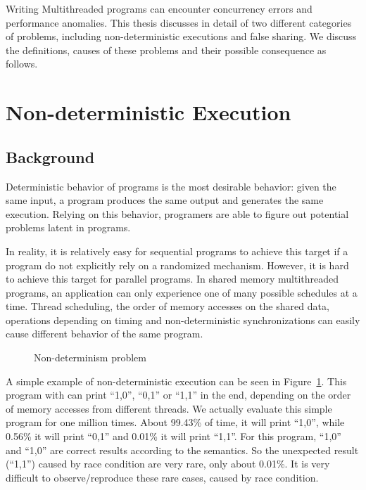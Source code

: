 \label{chapter:problems}

Writing Multithreaded programs can encounter concurrency errors and performance anomalies. This thesis discusses in detail of two different categories of problems, including non-deterministic executions and false sharing.  We discuss the definitions, causes of these problems and their possible consequence as follows.


\section{Non-deterministic Execution}

\subsection{Background}
Deterministic behavior of programs is the most desirable behavior: given the same input, a program
produces the same output and generates the same execution. Relying on this behavior, programers
are able to figure out potential problems latent in programs. 

In reality, it is relatively easy for sequential programs to achieve this target if a program do not explicitly rely on a randomized mechanism. 
However, it is hard to achieve this target for parallel programs. In shared memory multithreaded programs, an application can only experience one of many possible 
schedules at a time. Thread scheduling, the order of memory accesses on the shared data, operations depending on timing and non-deterministic synchronizations can easily cause different behavior of the same program.


\begin{figure}[!ht]
{\centering
\fbox{
\subfigure{}
\hspace{20pt}
\subfigure{}
\hspace{20pt}
\subfigure{}
}
\caption{Non-determinism problem 
\label{fig:nondeterminism}}
}
\end{figure}

A simple example of non-deterministic execution can be seen in Figure~\ref{fig:nondeterminism}. This program with \pthreads{} can print ``1,0'', ``0,1'' or ``1,1'' in the end, depending on the order of memory accesses from different threads. We actually evaluate this simple program for one million times. About 99.43\% of time, it will print ``1,0'', while 0.56\% it will print ``0,1'' and 0.01\% it will print ``1,1''. For this program, ``1,0'' and ``1,0'' are correct results according to the semantics. So the unexpected result (``1,1'') caused by race condition are very rare, only about 0.01\%.  
It is very difficult to observe/reproduce these rare cases, caused by race condition.

